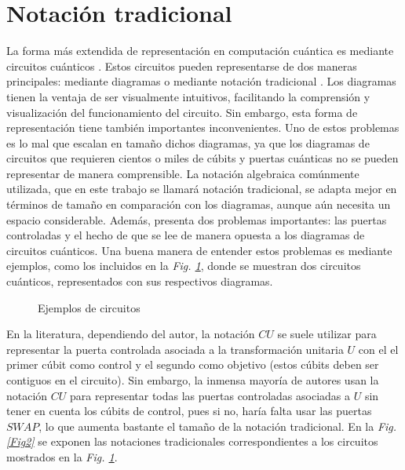 \documentclass[10pt,conference,a4paper]{IEEEtran}
\begin{document}
\section{Notación tradicional}
\label{seccion:2}
La forma más extendida de representación en computación cuántica es mediante  circuitos cuánticos \cite{Deutsch}. Estos circuitos pueden representarse de dos maneras principales: mediante diagramas o mediante  notación tradicional  \cite{Nielsen_Chuang}. Los diagramas tienen la ventaja de ser visualmente intuitivos, facilitando la comprensión y visualización del funcionamiento del circuito. Sin embargo, esta forma de representación tiene también importantes inconvenientes. Uno de estos problemas es lo mal que escalan en tamaño dichos diagramas, ya que los diagramas de circuitos que requieren cientos o miles de cúbits y puertas cuánticas no se pueden representar de manera comprensible. La notación algebraica comúnmente utilizada, que en este trabajo se llamará notación tradicional, se adapta mejor en términos de tamaño en comparación con los diagramas, aunque aún necesita un espacio considerable. Además, presenta dos problemas importantes: las puertas controladas y el hecho de que se lee de manera opuesta a los diagramas de circuitos cuánticos. Una buena manera de entender estos problemas es mediante ejemplos, como los incluidos en la \textit{Fig. \ref{Fig1}}, donde se muestran dos circuitos cuánticos, representados con sus respectivos diagramas.

\hypertarget{fig:ejemplos}{
\begin{figure}[htb!]
    \centering
    \caption{Ejemplos de circuitos}
    \label{Fig1}
\end{figure}}

En la literatura, dependiendo del autor, la notación $CU$ se suele utilizar para representar la puerta controlada asociada a la transformación unitaria $U$ con el el primer cúbit como control y el segundo como objetivo (estos cúbits deben ser contiguos en el circuito). Sin embargo, la inmensa mayoría de  autores usan la notación $CU$ para representar todas las puertas controladas asociadas a $U$ sin tener en cuenta los cúbits de control, pues si no, haría falta usar las puertas $SWAP$, lo que aumenta bastante el tamaño de la notación tradicional. En la \textit{Fig. \ref{Fig2}} se exponen las notaciones tradicionales correspondientes a los circuitos mostrados en la \textit{Fig. \ref{Fig1}}.
 
\end{document}
